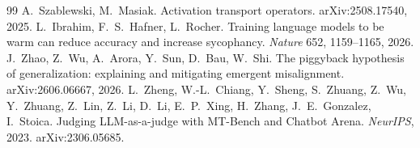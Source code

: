 \documentclass[11pt]{article}
\theoremstyle{definition}
\theoremstyle{definition}
\theoremstyle{assumptionstyle}
\begin{document}
\begin{thebibliography}{99}
 A.~Szablewski, M.~Masiak. Activation transport operators. arXiv:2508.17540, 2025.
L.~Ibrahim, F.~S.~Hafner, L.~Rocher.
Training language models to be warm can reduce accuracy and increase sycophancy.
\emph{Nature} 652, 1159--1165, 2026.
J.~Zhao, Z.~Wu, A.~Arora, Y.~Sun, D.~Bau, W.~Shi.
The piggyback hypothesis of generalization: explaining and mitigating emergent misalignment.
arXiv:2606.06667, 2026.
 L.~Zheng, W.-L.~Chiang, Y.~Sheng, S.~Zhuang, Z.~Wu,
Y.~Zhuang, Z.~Lin, Z.~Li, D.~Li, E.~P.~Xing, H.~Zhang, J.~E.~Gonzalez, I.~Stoica.
Judging LLM-as-a-judge with MT-Bench and Chatbot Arena. \emph{NeurIPS}, 2023.
arXiv:2306.05685.
\end{thebibliography}
\end{document}
